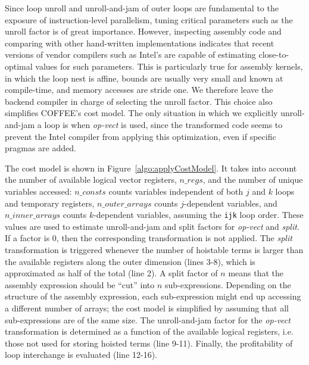 \documentclass[conference]{IEEEtran}
\begin{document}
Since loop unroll and unroll-and-jam of outer loops are fundamental to the exposure of instruction-level parallelism, tuning critical parameters such as the unroll factor is of great importance. However, inspecting assembly code and comparing with other hand-written implementations indicates that recent versions of vendor compilers such as Intel's are capable of estimating close-to-optimal values for such parameters. This is particularly true for assembly kernels, in which the loop nest is affine, bounds are usually very small and known at compile-time, and memory accesses are stride one. We therefore leave the backend compiler in charge of selecting the unroll factor. This choice also simplifies COFFEE's cost model. The only situation in which we explicitly unroll-and-jam a loop is when \emph{op-vect} is used, since the transformed code seems to prevent the Intel compiler from applying this optimization, even if specific pragmas are added. 


The cost model is shown in Figure~\ref{algo:applyCostModel}. It takes into account the number of available logical vector registers, $n\_regs$, and the number of unique variables accessed: $n\_consts$ counts variables independent of both $j$ and $k$ loops and temporary registers, $n\_outer\_arrays$ counts $j$-dependent variables, and $n\_inner\_arrays$ counts $k$-dependent variables, assuming the \texttt{ijk} loop order. These values are used to estimate unroll-and-jam and split factors for \emph{op-vect} and \emph{split}. If a factor is 0, then the corresponding transformation is not applied. The \emph{split} transformation is triggered whenever the number of hoistable terms is larger than the available registers along the outer dimension (lines 3-8), which is approximated as half of the total (line 2). A split factor of $n$ means that the assembly expression should be ``cut'' into $n$ sub-expressions. Depending on the structure of the assembly expression, each sub-expression might end up accessing a different number of arrays; the cost model is simplified by assuming that all sub-expressions are of the same size. The unroll-and-jam factor for the \emph{op-vect} transformation is determined as a function of the available logical registers, i.e. those not used for storing hoisted terms (line 9-11). Finally, the profitability of loop interchange is evaluated (line 12-16).
\end{document}
